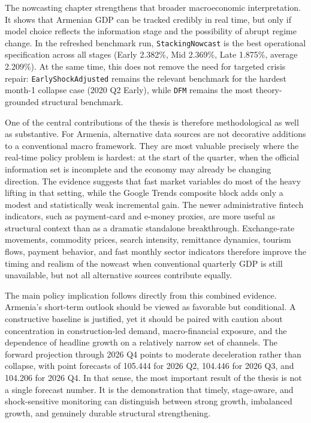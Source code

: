 \documentclass[12pt,a4paper]{report}
\begin{document}
The nowcasting chapter strengthens that broader macroeconomic interpretation. It shows that Armenian GDP can be tracked credibly in real time, but only if model choice reflects the information stage and the possibility of abrupt regime change. In the refreshed benchmark run, \texttt{StackingNowcast} is the best operational specification across all stages (Early 2.382\%, Mid 2.369\%, Late 1.875\%, average 2.209\%). At the same time, this does not remove the need for targeted crisis repair: \texttt{EarlyShockAdjusted} remains the relevant benchmark for the hardest month-1 collapse case (2020 Q2 Early), while \texttt{DFM} remains the most theory-grounded structural benchmark.

One of the central contributions of the thesis is therefore methodological as well as substantive. For Armenia, alternative data sources are not decorative additions to a conventional macro framework. They are most valuable precisely where the real-time policy problem is hardest: at the start of the quarter, when the official information set is incomplete and the economy may already be changing direction. The evidence suggests that fast market variables do most of the heavy lifting in that setting, while the Google Trends composite block adds only a modest and statistically weak incremental gain. The newer administrative fintech indicators, such as payment-card and e-money proxies, are more useful as structural context than as a dramatic standalone breakthrough. Exchange-rate movements, commodity prices, search intensity, remittance dynamics, tourism flows, payment behavior, and fast monthly sector indicators therefore improve the timing and realism of the nowcast when conventional quarterly GDP is still unavailable, but not all alternative sources contribute equally.

The main policy implication follows directly from this combined evidence. Armenia's short-term outlook should be viewed as favorable but conditional. A constructive baseline is justified, yet it should be paired with caution about concentration in construction-led demand, macro-financial exposure, and the dependence of headline growth on a relatively narrow set of channels. The forward projection through 2026 Q4 points to moderate deceleration rather than collapse, with point forecasts of 105.444 for 2026 Q2, 104.446 for 2026 Q3, and 104.206 for 2026 Q4. In that sense, the most important result of the thesis is not a single forecast number. It is the demonstration that timely, stage-aware, and shock-sensitive monitoring can distinguish between strong growth, imbalanced growth, and genuinely durable structural strengthening.
\end{document}
